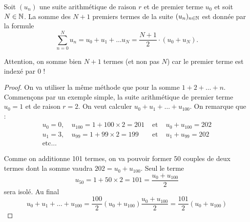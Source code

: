 \documentclass[a4paper, 12pt]{report}
\begin{document}
\begin{prop}
Soit $(u_n)$ une suite arithmétique de raison $r$ et de premier terme $u_0$ et soit $N \in \mathbb{N}$. La somme des $N+1$ premiers termes de la suite $(u_n)_{n \in \mathbb{N}}$ est donnée par la formule 
\[ \sum_{n=0}^N u_n = u_0+ u_1 + \dots u_N =  \dfrac{N+1}{2} \cdot (u_0 + u_N). \]
\end{prop}

\begin{rmq}
Attention, on somme bien $N+1$ termes (et non pas $N$) car le premier terme est indexé par 0 !
\end{rmq}

\begin{proof}
On va utiliser la même méthode que pour la somme $1+2+\dots+n$. Commençons par un exemple simple, la suite arithmétique de premier terme $u_0=1$ et de raison $r=2$. On veut calculer $u_0 + u_1 + \dots + u_{100}$.
On remarque que :
\begin{align*} 
u_0 = 0, ~ & u_{100} = 1 + 100 \times 2 = 201 & \text{ et } & u_0 + u_{100} = 202 \\
u_1 = 3, ~ & u_{99} = 1 + 99 \times 2 = 199 & \text{ et } & u_1 + u_{99} = 202 \\
\text{etc} \dots & & &
\end{align*}

Comme on additionne 101 termes, on va pouvoir former 50 couples de deux termes dont la somme vaudra $202=u_0+u_100$. Seul le terme 
\[ u_{50}=1+50 \times 2 = 101 = \dfrac{u_0+u_{100}}{2} \] 
sera isolé. Au final
\[ u_0 + u_1 + \dots + u_{100} = \dfrac{100}{2} (u_0+u_{100}) \dfrac{u_0+u_100}{2} = \dfrac{101}{2} (u_0+u_{100}) \]


\end{proof}
\end{document}
